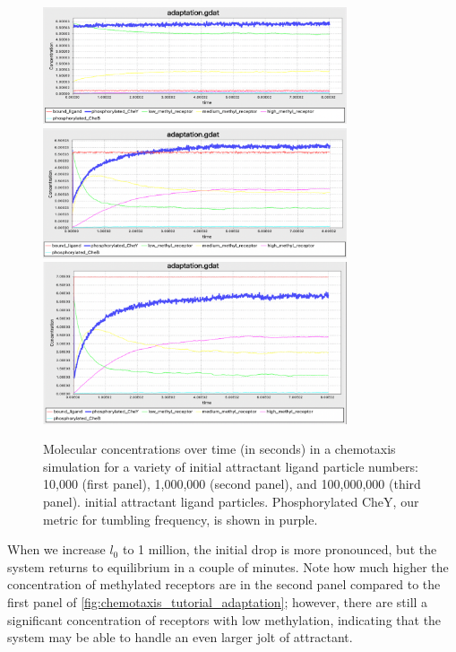 \begin{figure}[p]
\centering
\mySfFamily
\includegraphics[width = 0.8\textwidth]{../images/chemotaxis_tutorial_oneadd1e4.png}\\[2ex]
\includegraphics[width = 0.8\textwidth]{../images/chemotaxis_tutorial_oneadd1e6.png}\\[2ex]
\includegraphics[width = 0.8\textwidth]{../images/chemotaxis_tutorial_oneadd1e8.png}
\caption{Molecular concentrations over time (in seconds) in a chemotaxis simulation for a variety of initial attractant ligand particle numbers: 10,000 (first panel), 1,000,000 (second panel), and 100,000,000 (third panel). initial attractant ligand particles. Phosphorylated CheY, our metric for tumbling frequency, is shown in purple.}
\label{fig:chemotaxis_tutorial_adaptation}
\end{figure}

When we increase $l_0$ to 1 million, the initial drop is more pronounced, but the system returns  to equilibrium in a couple of minutes. Note how much higher the concentration of methylated receptors are in the second panel compared to the first panel of \autoref{fig:chemotaxis_tutorial_adaptation}; however, there are still a significant concentration of receptors with low methylation, indicating that the system may be able to handle an even larger jolt of attractant.

